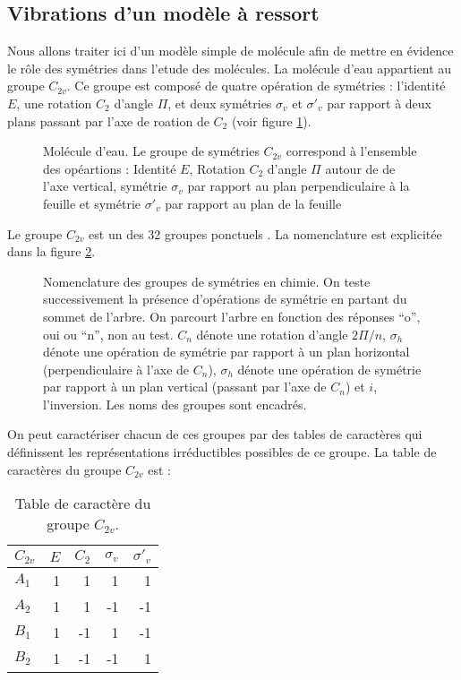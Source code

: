 \documentclass[12pt]{book}
\begin{document}
\subsection{Vibrations d'un mod\`ele \`a ressort}
Nous allons traiter ici d'un mod\`ele simple de mol\'ecule afin de
mettre en \'evidence le r\^ole des sym\'etries dans l'etude
des mol\'ecules. 
La mol\'ecule d'eau appartient au groupe $C_{2v}$. Ce groupe est
compos\'e de quatre op\'eration de sym\'etries : l'identit\'e $E$, une
rotation $C_2$ d'angle $\Pi$, et deux sym\'etries $\sigma_v$ et
$\sigma'_v$ par rapport \`a deux plans passant par l'axe de roation de
$C_2$ (voir figure \ref{figmoleceau}).
\begin{figure}[htb]
 \centerline{}   
 \caption{Mol\'ecule d'eau. Le groupe de sym\'etries $C_{2v}$
correspond \`a l'ensemble des op\'eartions : Identit\'e $E$, Rotation $C_2$
d'angle $\Pi$ autour de de l'axe vertical, sym\'etrie $\sigma_v$ par
rapport au plan perpendiculaire \`a la feuille et sym\'etrie
$\sigma'_v$ par rapport au plan de la feuille }
 \label{figmoleceau}
\end{figure}
Le groupe $C_{2v}$ est un des 32 groupes ponctuels
\cite{ma:group:Jones90,ph:solid:Ashcroft76}. La nomenclature est
explicit\'ee dans la figure \ref{figsymetr}.
\begin{figure}[htb]
\hspace{20mm}
 \caption{Nomenclature des groupes de sym\'etries en chimie. On teste
successivement la pr\'esence d'op\'erations de sym\'etrie en partant
du sommet de l'arbre. On parcourt l'arbre en fonction des r\'eponses
``o'', oui ou ``n'', non au test. $C_n$ d\'enote une rotation d'angle
$2\Pi/n$, $\sigma_h$ d\'enote une op\'eration de sym\'etrie par
rapport \`a un plan horizontal (perpendiculaire \`a l'axe de $C_n$),
$\sigma_h$ d\'enote une op\'eration de sym\'etrie par 
rapport \`a un plan vertical (passant par l'axe de $C_n$) et $i$,
l'inversion. Les noms des groupes sont encadr\'es.}
 \label{figsymetr}
\end{figure}
On peut caract\'eriser chacun de ces groupes par des tables de
caract\`eres qui d\'efinissent les repr\'esentations
irr\'eductibles possibles de
ce groupe.  
La table de caract\`eres du groupe $C_{2v}$ est :
\begin{table}[hbt]\label{tabchar}
\caption{Table de caract\`ere du groupe $C_{2v}$.}
\begin{center}
\begin{tabular}{|l|r|r|r|r|}
$C_{2v}$ & $E$ & $C_2$ & $\sigma_v$ & $\sigma'_v$\\
\hline
$A_1$&1&1&1&1\\
$A_2$&1&1&-1&-1\\
$B_1$&1&-1&1&-1\\
$B_2$&1&-1&-1&1\\
\end{tabular}
\end{center}
\end{table}
\end{document}
